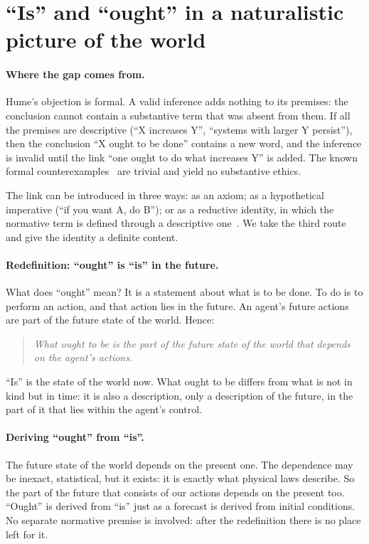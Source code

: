 \documentclass[11pt,a4paper]{article}
\begin{document}
\section{``Is'' and ``ought'' in a naturalistic picture of the world}\label{sec:isought}

\paragraph{Where the gap comes from.}
Hume's objection is formal. A valid inference adds nothing to its premises: the conclusion cannot contain a substantive term that was absent from them. If all the premises are descriptive (``X increases Y'', ``systems with larger Y persist''), then the conclusion ``X ought to be done'' contains a new word, and the inference is invalid until the link ``one ought to do what increases Y'' is added. The known formal counterexamples~\cite{prior1960} are trivial and yield no substantive ethics.

The link can be introduced in three ways: as an axiom; as a hypothetical imperative (``if you want A, do B''); or as a reductive identity, in which the normative term is defined through a descriptive one~\cite{railton1986}. We take the third route and give the identity a definite content.

\paragraph{Redefinition: ``ought'' is ``is'' in the future.}
What does ``ought'' mean? It is a statement about what is to be done. To do is to perform an action, and that action lies in the future. An agent's future actions are part of the future state of the world. Hence:

\begin{quote}
\emph{What ought to be is the part of the future state of the world that depends on the agent's actions.}
\end{quote}

``Is'' is the state of the world now. What ought to be differs from what is not in kind but in time: it is also a description, only a description of the future, in the part of it that lies within the agent's control.

\paragraph{Deriving ``ought'' from ``is''.}
The future state of the world depends on the present one. The dependence may be inexact, statistical, but it exists: it is exactly what physical laws describe. So the part of the future that consists of our actions depends on the present too. ``Ought'' is derived from ``is'' just as a forecast is derived from initial conditions. No separate normative premise is involved: after the redefinition there is no place left for it.
\end{document}
